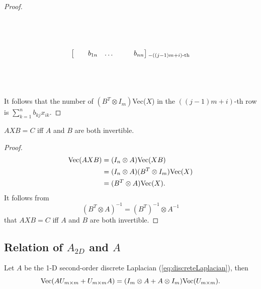\begin{proof}
\begin{displaymath}
\begin{aligned}
\begin{bmatrix}
        & & b_{1n}& \ldots & & &b_{nn}\\
      \end{bmatrix}
       \begin{matrix}
          \\
          \\
          \\
          \\
          _{-((j-1)m+i)\textmd{-th}}\\
          \\
          \\
          \\
          \\
        \end{matrix}
    \end{aligned}
  \end{displaymath}
  It follows that the number of $ (B^T\otimes I_m)$Vec($X$)
  in the $((j-1)m+i)$-th row is $\sum_{k=1}^nb_{kj}x_{ik}$.
\end{proof}

\begin{coro}
  $AXB=C$ iff $A$ and $B$ are both invertible.
\end{coro}

\begin{proof}
  \begin{displaymath}
    \begin{aligned}
      \textmd{Vec}(AXB)&=(I_n\otimes A)\textmd{Vec}(XB)\\
      &=(I_n\otimes A)(B^T\otimes I_m)\textmd{Vec}(X)\\
      &=(B^T\otimes A)\textmd{Vec}(X).
    \end{aligned}
  \end{displaymath}
  It follows from 
  \begin{displaymath}
    (B^T\otimes A)^{-1}=(B^{T})^{-1}\otimes A^{-1}
  \end{displaymath}
that $AXB=C$ iff $A$ and $B$ are both invertible.
\end{proof}


\subsection{Relation of $A_{2D}$ and $A$}
\label{sec:relation}

\begin{lem}
  Let $A$ be the 1-D second-order discrete Laplacian
  (\ref{eq:discreteLaplacian}), then
  \begin{equation}
  \textmd{Vec}(AU_{m\times m}+U_{m\times m}A)=
  (I_m\otimes A+ A\otimes I_m)\textmd{Vec}(U_{m\times m}).
\end{equation}
\end{lem}

